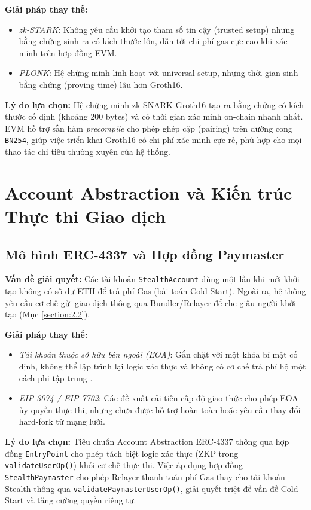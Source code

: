 \documentclass[../DoAn.tex]{subfiles}
\begin{document}
\textbf{Giải pháp thay thế:}
\begin{itemize}
    \item \textit{zk-STARK}: Không yêu cầu khởi tạo tham số tin cậy (trusted setup) nhưng bằng chứng sinh ra có kích thước lớn, dẫn tới chi phí gas cực cao khi xác minh trên hợp đồng EVM.
    \item \textit{PLONK}: Hệ chứng minh linh hoạt với universal setup, nhưng thời gian sinh bằng chứng (proving time) lâu hơn Groth16.
\end{itemize}

\textbf{Lý do lựa chọn:} Hệ chứng minh zk-SNARK Groth16 \cite{groth16} tạo ra bằng chứng có kích thước cố định (khoảng 200 bytes) và có thời gian xác minh on-chain nhanh nhất. EVM hỗ trợ sẵn hàm \textit{precompile} cho phép ghép cặp (pairing) trên đường cong \texttt{BN254}, giúp việc triển khai Groth16 có chi phí xác minh cực rẻ, phù hợp cho mọi thao tác chi tiêu thường xuyên của hệ thống.

\section{Account Abstraction và Kiến trúc Thực thi Giao dịch}
\label{sec:3.3}

\subsection{Mô hình ERC-4337 và Hợp đồng Paymaster}
\textbf{Vấn đề giải quyết:} Các tài khoản \texttt{StealthAccount} dùng một lần khi mới khởi tạo không có số dư ETH để trả phí Gas (bài toán Cold Start). Ngoài ra, hệ thống yêu cầu cơ chế gửi giao dịch thông qua Bundler/Relayer để che giấu người khởi tạo (Mục \ref{section:2.2}).

\textbf{Giải pháp thay thế:}
\begin{itemize}
    \item \textit{Tài khoản thuộc sở hữu bên ngoài (EOA)}: Gắn chặt với một khóa bí mật cố định, không thể lập trình lại logic xác thực và không có cơ chế trả phí hộ một cách phi tập trung \cite{ethereum_whitepaper}.
    \item \textit{EIP-3074 / EIP-7702}: Các đề xuất cải tiến cấp độ giao thức cho phép EOA ủy quyền thực thi, nhưng chưa được hỗ trợ hoàn toàn hoặc yêu cầu thay đổi hard-fork từ mạng lưới.
\end{itemize}

\textbf{Lý do lựa chọn:} Tiêu chuẩn Account Abstraction ERC-4337 \cite{erc4337} thông qua hợp đồng \texttt{EntryPoint} cho phép tách biệt logic xác thực (ZKP trong \texttt{validateUserOp()}) khỏi cơ chế thực thi. Việc áp dụng hợp đồng \texttt{StealthPaymaster} cho phép Relayer thanh toán phí Gas thay cho tài khoản Stealth thông qua \texttt{validatePaymasterUserOp()}, giải quyết triệt để vấn đề Cold Start và tăng cường quyền riêng tư.
\end{document}
